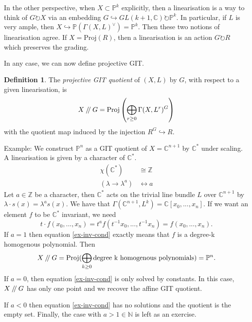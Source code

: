 \documentclass{article}
\theoremstyle{definition}
\newtheorem{defn}{Definition}
\newcommand{\C}{\mathbb{C}}
\newcommand{\bP}{\mathbb{P}}
\newcommand{\sslash}{\mathbin{/\mkern-4mu/}}
\newcommand{\Proj}{\text{Proj}}
\begin{document}
	In the other perspective, when $X\subset \bP^k$ explicitly, then a linearisation is a way to think of $G\circlearrowright X$ via an embedding $G\hookrightarrow GL(k+1,\C) \circlearrowright\bP^k$. In particular, if $L$ is very ample, then $X\hookrightarrow \bP(\Gamma(X,L)^\vee) = \bP^k$. Then these two notions of linearisation agree. If $X = \Proj(R)$, then a linearisation is an action $G\circlearrowright R$ which preserves the grading. \vspace{1em}
	
	In any case, we can now define projective GIT.
	\begin{defn}
		The \emph{projective GIT quotient} of $(X,L)$ by $G$, with respect to a given linearisation, is 
		\begin{equation}
			X\sslash G = \Proj\left(\bigoplus_{r\geq 0} \Gamma(X,L^r)^G\right)
		\end{equation}
		with the quotient map induced by the injection $R^G\hookrightarrow R$.
	\end{defn}
	Example: We construct $\bP^n$ as a GIT quotient of $X=\C^{n+1}$ by $\C^\ast$ under scaling. A linearisation is given by a character of $\C^\ast$. 
	\begin{align*}
		\chi(\C^\ast) &\cong \mathbb{Z}\\
		(\lambda\to\lambda^a) &\leftrightarrow a
	\end{align*}
	Let $a\in \mathbb{Z}$ be a character, then $\C^\ast$ acts on the trivial line bundle $L$ over $\C^{n+1}$ by $\lambda \cdot s(x) = \lambda^a s(x)$. We have that $\Gamma(\C^{n+1}, L^k) = \C[x_0,...,x_n]$. If we want an element $f$ to be $\C^\ast$ invariant, we need
	\begin{equation}
		\label{ex-inv-cond}
		t\cdot f(x_0,...,x_n) = t^a f(t^{-1}x_0,...,t^{-1}x_n) = f(x_0,...,x_n).
	\end{equation}
	If $a=1$ then equation \ref{ex-inv-cond} exactly means that $f$ is a degree-k homogenous polynomial. Then 
	$$X\sslash G = \Proj(\bigoplus_{k\geq 0} \text{degree k homogenous polynomials}) = \bP^n.$$
	If $a=0$, then equation \ref{ex-inv-cond} is only solved by constants. In this case, $X\sslash G$ has only one point and we recover the affine GIT quotient. \vspace{1em}
	
	If $a<0$ then equation \ref{ex-inv-cond} has no solutions and the quotient is the empty set. Finally, the case with $a>1 \in \mathbb{N}$ is left as an exercise. \vspace{1em}
	
\end{document}
